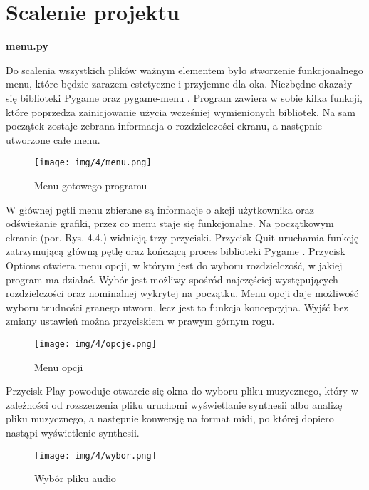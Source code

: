 \section{Scalenie projektu}

\noindent\textbf{menu.py}

Do scalenia wszystkich plików ważnym elementem było stworzenie funkcjonalnego menu, które będzie zarazem estetyczne i przyjemne dla oka.
Niezbędne okazały się biblioteki Pygame \cite{pygame} oraz pygame-menu \cite{pygame_menu}. Program zawiera w sobie kilka funkcji, które poprzedza zainicjowanie użycia wcześniej wymienionych bibliotek. Na sam początek zostaje zebrana informacja o rozdzielczości ekranu, a następnie utworzone całe menu.

\begin{figure}[h]
  \centering
  \texttt{[image: img/4/menu.png]}
  \caption{Menu gotowego programu}
\end{figure}

W głównej pętli menu zbierane są informacje o akcji użytkownika oraz odświeżanie grafiki, przez co menu staje się funkcjonalne. Na początkowym ekranie (por. Rys. 4.4.) widnieją trzy przyciski. Przycisk Quit uruchamia funkcję zatrzymującą główną pętlę oraz kończącą proces biblioteki Pygame \cite{pygame}. Przycisk Options otwiera menu opcji, w którym jest do wyboru rozdzielczość, w jakiej program ma działać. Wybór jest możliwy spośród najczęściej występujących rozdzielczości oraz nominalnej wykrytej na początku. Menu opcji daje możliwość wyboru trudności granego utworu, lecz jest to funkcja koncepcyjna. Wyjść bez zmiany ustawień można przyciskiem w prawym górnym rogu.

\begin{figure}[h]
  \centering
  \texttt{[image: img/4/opcje.png]}
  \caption{Menu opcji}
\end{figure}

\newpage
Przycisk Play powoduje otwarcie się okna do wyboru pliku muzycznego, który w zależności od rozszerzenia pliku uruchomi wyświetlanie synthesii albo analizę pliku muzycznego, a następnie konwersję na format midi, po której dopiero nastąpi wyświetlenie synthesii.

\begin{figure}[h]
  \centering
  \texttt{[image: img/4/wybor.png]}
  \caption{Wybór pliku audio}
\end{figure}